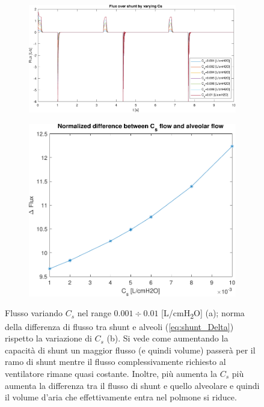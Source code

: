 \begin{figure}[t!]
	\begin{subfigure}{0.6\linewidth}
		\centering
		\includegraphics[width=0.95\linewidth]{../model/data_log/Cs_fluxCS.pdf}
		\caption{}
	\end{subfigure}\hfill
	\begin{subfigure}{0.4\linewidth}
		\centering
		\includegraphics[width=0.95\linewidth]{../model/data_log/CwCL_deltaflux.pdf}
		\caption{}
	\end{subfigure}\hfill
	\caption{Flusso variando $C_s$ nel range $0.001\div 0.01$ [L/cmH\textsubscript{2}O] (a); norma della differenza di flusso tra shunt e alveoli (\cref{eq:shunt_Delta}) rispetto la variazione di $C_s$ (b). Si vede come aumentando la capacità di shunt un maggior flusso (e quindi volume) passerà per il ramo di shunt mentre il flusso complessivamente richiesto al ventilatore rimane quasi costante. Inoltre, più aumenta la $C_s$ più aumenta la differenza tra il flusso di shunt e quello alveolare e quindi il volume d'aria che effettivamente entra nel polmone si riduce. }
\end{figure}



